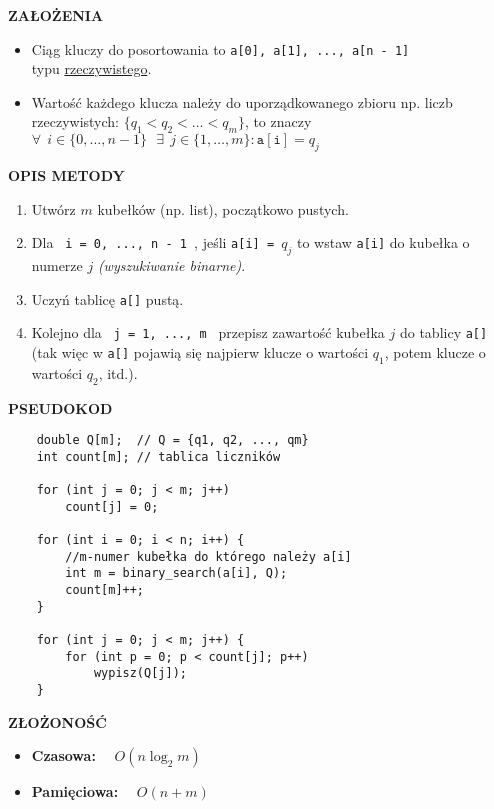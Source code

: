 \documentclass[advanced-sorts.tex]{subfiles}
\begin{document}
    \textbf{ZAŁOŻENIA}
    \begin{itemize}
        \item Ciąg kluczy do posortowania to
            \texttt{a[0], a[1], ..., a[n - 1]} \\ typu
            \underline{rzeczywistego}.
        \item Wartość każdego klucza należy do uporządkowanego zbioru np. liczb
            rzeczywistych: $\{ q_1 < q_2 < \ldots < q_m \}$, to znaczy\\
            $ \forall ~~ i \in \{ 0, \ldots, n - 1 \} ~~~ \exists ~~ j \in
            \{ 1, \ldots, m \} : \mathtt{a[i]} = q_j $
    \end{itemize}

    \textbf{OPIS METODY}
    \begin{enumerate}
        \item Utwórz $m$ kubełków (np. list), początkowo pustych.
        \item Dla \texttt{ i = 0, ..., n - 1 }, jeśli \texttt{a[i] = }$q_j$
            to wstaw \texttt{a[i]} do kubełka o numerze $j$
            \textit{(wyszukiwanie binarne)}.
        \item Uczyń tablicę \texttt{a[]} pustą.
        \item Kolejno dla \texttt{ j = 1, ..., m } przepisz zawartość kubełka $j$
            do tablicy \texttt{a[]} (tak więc w \texttt{a[]} pojawią się
            najpierw klucze o wartości $q_1$, potem klucze o wartości $q_2$,
            itd.).
    \end{enumerate}

    \textbf{PSEUDOKOD}
    \begin{verbatim}
    double Q[m];  // Q = {q1, q2, ..., qm}
    int count[m]; // tablica liczników

    for (int j = 0; j < m; j++)
        count[j] = 0;

    for (int i = 0; i < n; i++) {
        //m-numer kubełka do którego należy a[i]
        int m = binary_search(a[i], Q);
        count[m]++;
    }

    for (int j = 0; j < m; j++) {
        for (int p = 0; p < count[j]; p++)
            wypisz(Q[j]);
    }
   \end{verbatim}

    \textbf{ZŁOŻONOŚĆ}
    \begin{itemize}
        \item \textbf{Czasowa:} ~~$O(n \log_2 m)$
        \item \textbf{Pamięciowa:} ~~$O(n + m)$
    \end{itemize}



\end{document}
